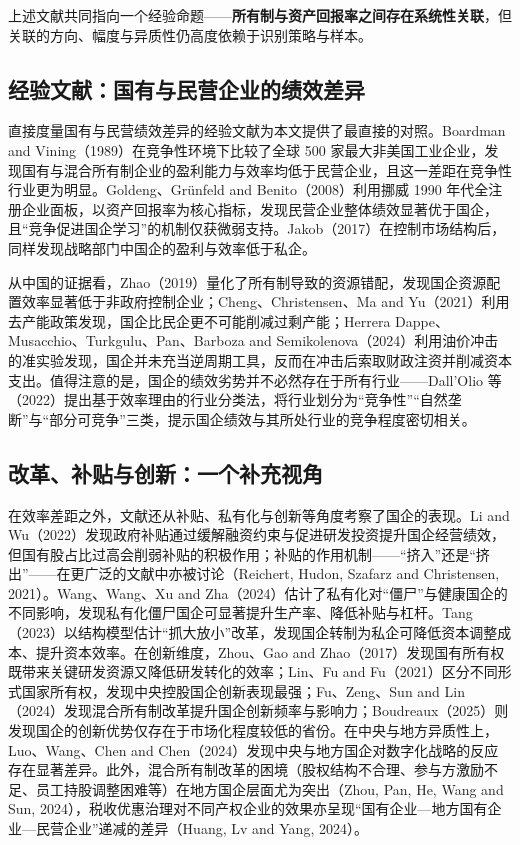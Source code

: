 \documentclass[11pt,a4paper]{ctexart}
\begin{document}
上述文献共同指向一个经验命题——\textbf{所有制与资产回报率之间存在系统性关联}，但关联的方向、幅度与异质性仍高度依赖于识别策略与样本。

\subsection{经验文献：国有与民营企业的绩效差异}

直接度量国有与民营绩效差异的经验文献为本文提供了最直接的对照。Boardman and Vining（1989）在竞争性环境下比较了全球 500 家最大非美国工业企业，发现国有与混合所有制企业的盈利能力与效率均低于民营企业，且这一差距在竞争性行业更为明显。Goldeng、Grünfeld and Benito（2008）利用挪威 1990 年代全注册企业面板，以资产回报率为核心指标，发现民营企业整体绩效显著优于国企，且“竞争促进国企学习”的机制仅获微弱支持。Jakob（2017）在控制市场结构后，同样发现战略部门中国企的盈利与效率低于私企。

从中国的证据看，Zhao（2019）量化了所有制导致的资源错配，发现国企资源配置效率显著低于非政府控制企业；Cheng、Christensen、Ma and Yu（2021）利用去产能政策发现，国企比民企更不可能削减过剩产能；Herrera Dappe、Musacchio、Turkgulu、Pan、Barboza and Semikolenova（2024）利用油价冲击的准实验发现，国企并未充当逆周期工具，反而在冲击后索取财政注资并削减资本支出。值得注意的是，国企的绩效劣势并不必然存在于所有行业——Dall'Olio 等（2022）提出基于效率理由的行业分类法，将行业划分为“竞争性”“自然垄断”与“部分可竞争”三类，提示国企绩效与其所处行业的竞争程度密切相关。

\subsection{改革、补贴与创新：一个补充视角}

在效率差距之外，文献还从补贴、私有化与创新等角度考察了国企的表现。Li and Wu（2022）发现政府补贴通过缓解融资约束与促进研发投资提升国企经营绩效，但国有股占比过高会削弱补贴的积极作用；补贴的作用机制——“挤入”还是“挤出”——在更广泛的文献中亦被讨论（Reichert, Hudon, Szafarz and Christensen, 2021）。Wang、Wang、Xu and Zha（2024）估计了私有化对“僵尸”与健康国企的不同影响，发现私有化僵尸国企可显著提升生产率、降低补贴与杠杆。Tang（2023）以结构模型估计“抓大放小”改革，发现国企转制为私企可降低资本调整成本、提升资本效率。在创新维度，Zhou、Gao and Zhao（2017）发现国有所有权既带来关键研发资源又降低研发转化的效率；Lin、Fu and Fu（2021）区分不同形式国家所有权，发现中央控股国企创新表现最强；Fu、Zeng、Sun and Lin（2024）发现混合所有制改革提升国企创新频率与影响力；Boudreaux（2025）则发现国企的创新优势仅存在于市场化程度较低的省份。在中央与地方异质性上，Luo、Wang、Chen and Chen（2024）发现中央与地方国企对数字化战略的反应存在显著差异。此外，混合所有制改革的困境（股权结构不合理、参与方激励不足、员工持股调整困难等）在地方国企层面尤为突出（Zhou, Pan, He, Wang and Sun, 2024），税收优惠治理对不同产权企业的效果亦呈现“国有企业—地方国有企业—民营企业”递减的差异（Huang, Lv and Yang, 2024）。
\end{document}
